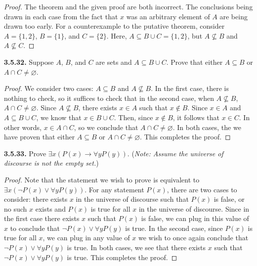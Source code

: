 \documentclass[12pt]{amsart}
\newenvironment{statement}[1]{\smallskip\noindent\color[rgb]{.6627, .3529, .6314} {\bf #1.}}{}
\theoremstyle{definition}
\theoremstyle{remark}
\begin{document}
\begin{proof}
The theorem and the given proof are both incorrect.
The conclusions being drawn in each case from the fact that $x$ was an arbitrary element of $A$ are being drawn too early.
For a counterexample to the putative theorem, consider $A = \{ 1, 2 \}$, $B = \{ 1 \}$, and $C = \{ 2 \}$.
Here, $A \subseteq B \cup C = \{ 1, 2 \}$, but $A \nsubseteq B$ and $A \nsubseteq C$.
\end{proof}


\begin{statement}{3.5.32}
Suppose $A$, $B$, and $C$ are sets and $A \subseteq B \cup C$.
Prove that either $A \subseteq B$ or $A \cap C \neq \varnothing$.
\end{statement}

\begin{proof}
We consider two cases: $A \subseteq B$ and $A \nsubseteq B$.
In the first case, there is nothing to check, so it suffices to check that in the second case, when $A \nsubseteq B$, $A \cap C \neq \varnothing$.
Since $A \nsubseteq B$, there exists $x \in A$ such that $x \notin B$.
Since $x \in A$ and $A \subseteq B \cup C$, we know that $x \in B \cup C$.
Then, since $x \notin B$, it follows that $x \in C$.
In other words, $x \in A \cap C$, so we conclude that $A \cap C \neq \varnothing$.
In both cases, the we have proven that either $A \subseteq B$ or $A \cap C \neq \varnothing$.
This completes the proof.
\end{proof}


\begin{statement}{3.5.33}
Prove $\exists x (P(x) \rightarrow \forall y P(y))$.
(\emph{Note: Assume the universe of discourse is not the empty set.})
\end{statement}

\begin{proof}
Note that the statement we wish to prove is equivalent to $\exists x (\neg P(x) \vee \forall y P(y))$.
For any statement $P(x)$, there are two cases to consider: there exists $x$ in the universe of discourse such that $P(x)$ is false, or no such $x$ exists and $P(x)$ is true for all $x$ in the universe of discourse.
Since in the first case there exists $x$ such that $P(x)$ is false, we can plug in this value of $x$ to conclude that $\neg P(x) \vee \forall y P(y)$ is true.
In the second case, since $P(x)$ is true for all $x$, we can plug in any value of $x$ we wish to once again conclude that $\neg P(x) \vee \forall y P(y)$ is true.
In both cases, we see that there exists $x$ such that $\neg P(x) \vee \forall y P(y)$ is true.
This completes the proof.
\end{proof}
\end{document}
